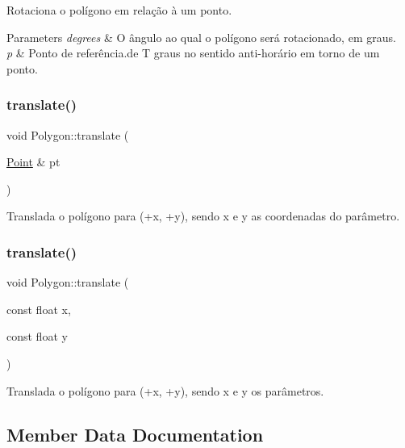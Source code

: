 Rotaciona o polígono em relação à um ponto. 
\begin{DoxyParams}{Parameters}
{\em degrees} & O ângulo ao qual o polígono será rotacionado, em graus. \\
\hline
{\em p} & Ponto de referência.\+de T graus no sentido anti-\/horário em torno de um ponto. \\
\hline
\end{DoxyParams}
\mbox{\label{class_polygon_a5a514d6e28bb6f5e1bccd007e75bb512}} 
\subsubsection{\texorpdfstring{translate()}{translate()}\hspace{0.1cm}{\footnotesize\ttfamily [1/2]}}
{\footnotesize\ttfamily void Polygon\+::translate (\begin{DoxyParamCaption}\item[{\hyperlink{class_point}{Point} \&}]{pt }\end{DoxyParamCaption})}

Translada o polígono para (+x, +y), sendo x e y as coordenadas do parâmetro. \mbox{\label{class_polygon_ae9ccf7a74ff5ac4dcc776d0e334d9d55}} 
\subsubsection{\texorpdfstring{translate()}{translate()}\hspace{0.1cm}{\footnotesize\ttfamily [2/2]}}
{\footnotesize\ttfamily void Polygon\+::translate (\begin{DoxyParamCaption}\item[{const float}]{x,  }\item[{const float}]{y }\end{DoxyParamCaption})}

Translada o polígono para (+x, +y), sendo x e y os parâmetros. 

\subsection{Member Data Documentation}
\mbox{\label{class_polygon_ab6ae45da59b24da7c101721dfa784690}} 
